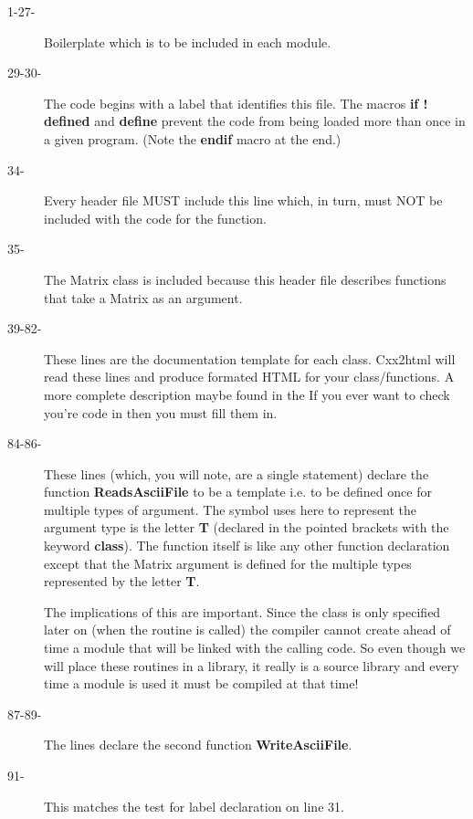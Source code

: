 \begin{description}
\item[1-27-] Boilerplate which is to be included in each module.

\item[29-30-]   The code begins with a label that identifies this file. The macros
{\bf if ! defined} and {\bf define} prevent the code from being
loaded more than once in a given program. (Note the {\bf endif} macro at the
end.)

\item[34-] Every header file MUST include this line which, in turn, must NOT be
included with the code for the function.

\item[35-] The Matrix class is included because this header file describes functions
that take a Matrix as an argument.

\item[39-82-]  These lines are the documentation template for each class.  Cxx2html
will read these lines and produce formated HTML for your class/functions.
A more complete description maybe found in the 
If you ever want to check you're code in then you must fill them in.

\item[84-86-] These lines (which, you will note, are a single statement) declare the
function {\bf ReadsAsciiFile} to be a template i.e. to be
defined once for multiple types of argument. The symbol uses here to represent
the argument type is the letter {\bf T} (declared in the pointed brackets with
the keyword {\bf class}).
The function itself is like any other
function declaration except that the Matrix argument
is defined for the multiple types represented by the letter {\bf T}.

The implications of this are important. Since the class is only specified
later on (when the routine is called) the compiler cannot create ahead of time
a module that will be linked with the calling code.  So even though we will 
place these routines in a library, it really is a source library and every
time a module is used it must be compiled at that time!
  
\item[87-89-] The lines declare the second function {\bf WriteAsciiFile}.

\item[91-] This matches the test for label declaration on line 31.
\end{description}


